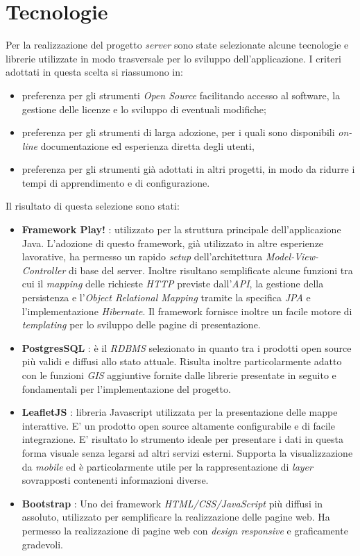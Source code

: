 \section{Tecnologie}
Per la realizzazione del progetto \emph{server} sono state selezionate alcune tecnologie e librerie utilizzate in modo trasversale per lo sviluppo dell'applicazione. I criteri adottati in questa scelta si riassumono in:
\begin{itemize}
\item preferenza per gli strumenti \emph{Open Source} facilitando accesso al software, la gestione delle licenze e lo sviluppo di eventuali modifiche;
\item preferenza per gli strumenti di larga adozione, per i quali sono disponibili \emph{on-line} documentazione ed esperienza diretta degli utenti,
\item preferenza per gli strumenti già adottati in altri progetti, in modo da ridurre i tempi di apprendimento e di configurazione.
\end{itemize}

Il risultato di questa selezione sono stati:
\begin{itemize}
\item \textbf{Framework Play!} \cite{playframework}: utilizzato per la struttura principale dell'applicazione Java. L'adozione di questo framework, già utilizzato in altre esperienze lavorative, ha permesso un rapido \emph{setup} dell'architettura \emph{Model-View-Controller} di base del server. Inoltre risultano semplificate alcune funzioni tra cui il \emph{mapping} delle richieste \emph{HTTP} previste dall'\emph{API}, la gestione della persistenza e l'\emph{Object Relational Mapping} tramite la specifica \emph{JPA} e l'implementazione \emph{Hibernate}. Il framework fornisce inoltre un facile motore di \emph{templating} per lo sviluppo delle pagine di presentazione.
\item \textbf{PostgresSQL} \cite{postgresql}: è il \emph{RDBMS} selezionato in quanto tra i prodotti open source più validi e diffusi allo stato attuale. Risulta inoltre particolarmente adatto con le funzioni \emph{GIS} aggiuntive fornite dalle librerie presentate in seguito e fondamentali per l'implementazione del progetto.
\item \textbf{LeafletJS} \cite{leafletjs}: libreria Javascript utilizzata per la presentazione delle mappe interattive. E' un prodotto open source altamente configurabile e di facile integrazione. E' risultato lo strumento ideale per presentare i dati in questa forma visuale senza legarsi ad altri servizi esterni. Supporta la visualizzazione da \emph{mobile} ed è particolarmente utile per la rappresentazione di \emph{layer} sovrapposti contenenti informazioni diverse.
\item \textbf{Bootstrap} \cite{bootstrap}: Uno dei framework \emph{HTML/CSS/JavaScript} più diffusi in assoluto, utilizzato per semplificare la realizzazione delle pagine web. Ha permesso la realizzazione di pagine web con \emph{design responsive} e graficamente gradevoli.
\end{itemize}
